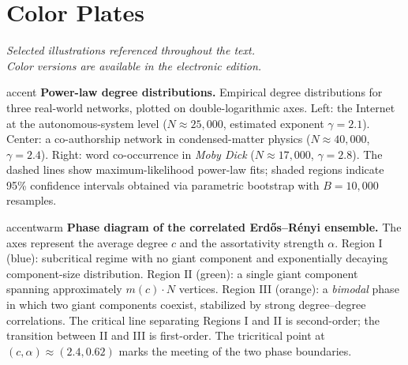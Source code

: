 \chapter*{Color Plates}

\vspace{-16pt}

\begin{center}
{\large\itshape\color{textdark!70!black}
  Selected illustrations referenced throughout the text.\\[4pt]
  Color versions are available in the electronic edition.}
\end{center}

\vspace{8pt}

\begin{colorplate}{accent}
{\bfseries Power-law degree distributions.} Empirical degree distributions for three real-world networks, plotted on double-logarithmic axes. Left: the Internet at the autonomous-system level ($N \approx 25{,}000$, estimated exponent $\gamma = 2.1$). Center: a co-authorship network in condensed-matter physics ($N \approx 40{,}000$, $\gamma = 2.4$). Right: word co-occurrence in \textit{Moby Dick} ($N \approx 17{,}000$, $\gamma = 2.8$). The dashed lines show maximum-likelihood power-law fits; shaded regions indicate 95\% confidence intervals obtained via parametric bootstrap with $B = 10{,}000$ resamples.
\end{colorplate}

\bigskip

\begin{colorplate}{accentwarm}
{\bfseries Phase diagram of the correlated Erd\H{o}s--R\'{e}nyi ensemble.} The axes represent the average degree $c$ and the assortativity strength $\alpha$. Region I (blue): subcritical regime with no giant component and exponentially decaying component-size distribution. Region II (green): a single giant component spanning approximately $m(c) \cdot N$ vertices. Region III (orange): a \textit{bimodal} phase in which two giant components coexist, stabilized by strong degree--degree correlations. The critical line separating Regions I and II is second-order; the transition between II and III is first-order. The tricritical point at $(c, \alpha) \approx (2.4, 0.62)$ marks the meeting of the two phase boundaries.
\end{colorplate}

\bigskip


